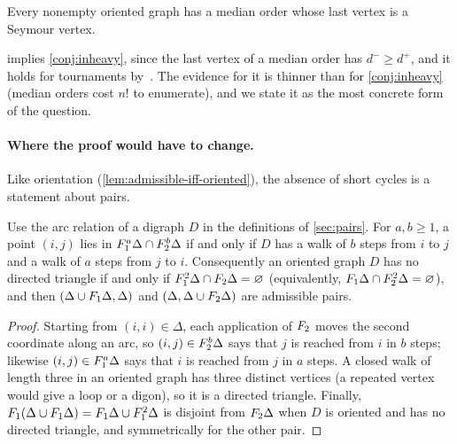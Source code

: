 \begin{conjecture}\label{conj:median}
Every nonempty oriented graph has a median order whose last vertex is a Seymour vertex.
\end{conjecture}

 implies \cref{conj:inheavy}, since the last vertex of a median order
has $d^-\ge d^+$, and it holds for tournaments by~\cite{HavetThomasse2000}. The evidence
for it is thinner than for \cref{conj:inheavy} (median orders cost $n!$ to enumerate),
and we state it as the most concrete form of the question.

\paragraph{Where the proof would have to change.}
Like orientation (\cref{lem:admissible-iff-oriented}), the absence of short cycles is
a statement about pairs.

\begin{lemma}\label{lem:girth-grid}
Use the arc relation of a digraph $D$ in the definitions of \cref{sec:pairs}. For
$a,b\ge1$, a point $(i,j)$ lies in $F_1^a\Delta\cap F_2^b\Delta$ if and only if $D$ has a
walk of $b$ steps from $i$ to $j$ and a walk of $a$ steps from $j$ to $i$. Consequently
an oriented graph $D$ has no directed triangle if and only if
$F_1^2\Delta\cap F_2\Delta=\varnothing$ (equivalently,
$F_1\Delta\cap F_2^2\Delta=\varnothing$), and then $(\Delta\cup F_1\Delta,\Delta)$ and
$(\Delta,\Delta\cup F_2\Delta)$ are admissible pairs.
\end{lemma}

\begin{proof}
Starting from $(i,i)\in\Delta$, each application of $F_2$ moves the second coordinate
along an arc, so $(i,j)\in F_2^b\Delta$ says that $j$ is reached from $i$ in $b$ steps;
likewise $(i,j)\in F_1^a\Delta$ says that $i$ is reached from $j$ in $a$ steps. A closed
walk of length three in an oriented graph has three distinct vertices (a repeated vertex
would give a loop or a digon), so it is a directed triangle. Finally,
$F_1(\Delta\cup F_1\Delta)=F_1\Delta\cup F_1^2\Delta$ is disjoint from $F_2\Delta$ when $D$
is oriented and has no directed triangle, and symmetrically for the other pair.
\end{proof}

